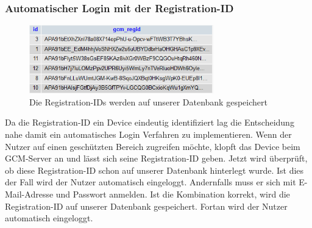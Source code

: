 \documentclass{report}
\begin{document}
\subsubsection{Automatischer Login mit der Registration-ID}
\begin{figure}[!htb]
    \centerline{
        \includegraphics[width=8cm]{Bilder/regids.png}
    }
    \caption{Die Registration-IDs werden auf unserer Datenbank gespeichert}
    \label{regids}
\end{figure}
Da die Registration-ID ein Device eindeutig identifiziert lag die Entscheidung nahe damit ein automatisches Login Verfahren zu implementieren.
Wenn der Nutzer auf einen geschützten Bereich zugreifen möchte, klopft das Device beim GCM-Server an und lässt sich seine Registration-ID geben. 
Jetzt wird überprüft, ob diese Registration-ID schon auf unserer Datenbank hinterlegt wurde. Ist dies der Fall wird der Nutzer automatisch eingeloggt.
Andernfalls muss er sich mit E-Mail-Adresse und Passwort anmelden.
Ist die Kombination korrekt, wird die Registration-ID auf unserer Datenbank gespeichert. Fortan wird der Nutzer automatisch eingeloggt.
\end{document}
